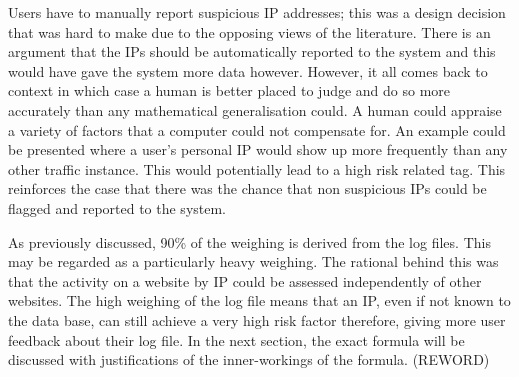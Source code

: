 Users have to manually report suspicious IP addresses; this was a design decision that was hard to make due to the opposing views of the literature. There is an argument that the IPs should be automatically reported to the system and this would have gave the system more data however. However, it all comes back to context in which case a human is better placed to judge and do so more accurately than any mathematical generalisation could. A human could appraise a variety of factors that a computer could not compensate for. An example could be presented where a user's personal IP would show up more frequently than any other traffic instance. This would potentially lead to a high risk related tag. This reinforces the case that there was the chance that non suspicious IPs could be flagged and reported to the system. 

As previously discussed, 90\% of the weighing is derived from the log files. This may be regarded as a particularly heavy weighing. The rational behind this was that the activity on a website by IP could be assessed independently of other websites. The high weighing of the log file means that an IP, even if not known to the data base, can still achieve a very high risk factor therefore, giving more user feedback about their log file. In the next section, the exact formula will be discussed with justifications of the inner-workings of the formula. (REWORD)

